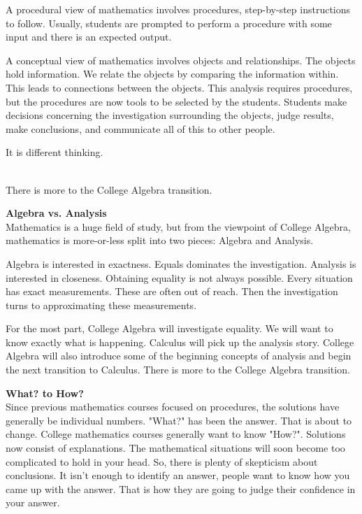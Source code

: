 \documentclass{ximera}
\begin{document}
\begin{idea}
A procedural view of mathematics involves procedures, step-by-step instructions to follow. Usually, students are prompted to perform a procedure with some input and there is an expected output.  

A conceptual view of mathematics involves objects and relationships. The objects hold information. We relate the objects by comparing the information within. This leads to connections between the objects. This analysis requires procedures, but the procedures are now tools to be selected by the students.  Students make decisions concerning the investigation surrounding the objects, judge results, make conclusions, and communicate all of this to other people.

It is different thinking.

\end{idea}




\\
There is more to the College Algebra transition.







\textbf{Algebra vs. Analysis} \\
Mathematics is a huge field of study, but from the viewpoint of College Algebra, mathematics is more-or-less split into two pieces: Algebra and Analysis.

Algebra is interested in exactness.  Equals dominates the investigation. Analysis is interested in closeness.  Obtaining equality is not always possible.  Every situation has exact measurements. These are often out of reach.  Then the investigation turns to approximating these measurements.

For the most part, College Algebra will investigate equality.  We will want to know exactly what is happening. Calculus will pick up the analysis story. College Algebra will also introduce some of the beginning concepts of analysis and begin the next transition to Calculus.
There is more to the College Algebra transition.






\textbf{What? to How?} \\
Since previous mathematics courses focused on procedures, the solutions have generally be individual numbers.  "What?" has been the answer.  That is about to change. College mathematics courses generally want to know "How?". Solutions now consist of explanations. 
The mathematical situations will soon become too complicated to hold in your head.  So, there is plenty of skepticism about conclusions. It isn't enough to identify an answer, people want to know how you came up with the answer.  That is how they are going to judge their confidence in your answer.  
\end{document}
